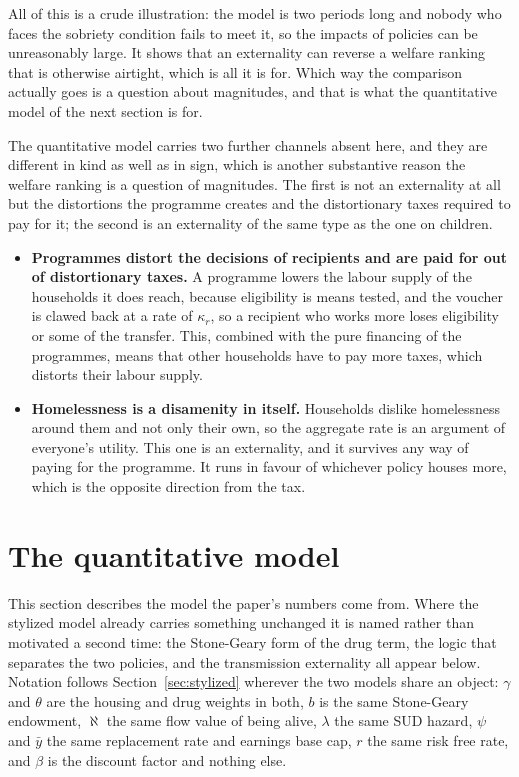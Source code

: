 \documentclass[10pt]{article}
\begin{document}
All of this is a crude illustration: the model is two periods long and
nobody who faces the sobriety condition fails to meet it, so the impacts of
policies can be unreasonably large. It shows that an
externality can reverse a welfare ranking that is
otherwise airtight, which is all it is for. Which way the comparison actually
goes is a question about magnitudes, and that is what the quantitative model of
the next section is for.


The quantitative model carries two further channels absent here, and
they are different in kind as well as in sign, which is another substantive reason
the welfare ranking is a question of magnitudes. The first is not an externality at
all but the distortions the programme creates and the distortionary taxes
required to pay for it; the second is an externality of the
same type as the one on children.

\begin{itemize}\setlength{\itemsep}{0.15em}
\item \textbf{Programmes distort the decisions of recipients and are
paid for out of distortionary taxes.} A programme lowers the labour supply of the households it
does reach, because eligibility is means tested, and the voucher is clawed back at a
rate of $\kappa_r$, so a recipient who works more loses eligibility or
some of the transfer.
This, combined with the pure financing of the programmes, means that other
households have to pay more taxes, which
distorts their labour supply.

\item \textbf{Homelessness is a disamenity in itself.} Households dislike
homelessness around them and not only their own, so the aggregate rate is an
argument of everyone's utility. This one is an externality, and it
survives any way of paying for the programme. It runs in favour of whichever policy houses
more, which is the opposite direction from the tax.
\end{itemize}



\section{The quantitative model}\label{sec:full}

This section describes the model the paper's numbers come from. Where
the stylized model already carries something unchanged it is named rather than
motivated a second time: the Stone-Geary form of the drug term, the logic that
separates the two policies, and the transmission externality all appear below.
Notation follows Section~\ref{sec:stylized} wherever the two models share an
object: $\gamma$ and $\theta$ are the housing and drug weights in both, $b$ is the
same Stone-Geary endowment, $\aleph$ the same flow value of being alive, $\lambda$
the same SUD hazard, $\psi$ and $\bar y$ the same replacement rate and
earnings base cap, $r$ the same risk free rate, and $\beta$ is the discount
factor and nothing else.
\end{document}
